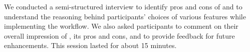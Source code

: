 We conducted a semi-structured interview to 
identify pros and cons of \system
and to understand the reasoning behind participants' choices of various features while implementing the workflow. 
We also asked participants to comment on their overall impression of 
\system, its pros and cons, and to provide feedback for future enhancements. 
This session lasted for about 15 minutes.



